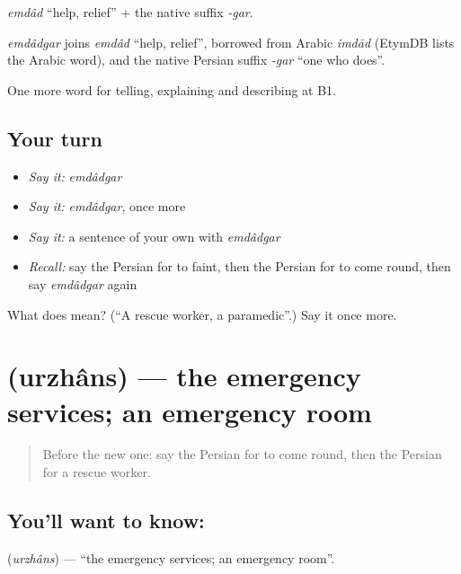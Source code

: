 \emph{emdâd} \textquotedblleft{}help, relief\textquotedblright{} + the native suffix \emph{-gar}.

\begin{cousinweb}
\emph{emdâdgar} joins \emph{emdâd} \textquotedblleft{}help, relief\textquotedblright{}, borrowed from Arabic \emph{imdād} (EtymDB lists the Arabic word), and the native Persian suffix \emph{-gar} \textquotedblleft{}one who does\textquotedblright{}.
\end{cousinweb}

\begin{grammarlens}[title={What you've built}]
One more word for telling, explaining and describing at B1.
\end{grammarlens}

\subsection*{Your turn}
\begin{itemize}
\raggedright
  \item \emph{Say it:} \emph{emdâdgar}
  \item \emph{Say it:} \emph{emdâdgar}, once more
  \item \emph{Say it:} a sentence of your own with \emph{emdâdgar}
  \item \emph{Recall:} say the Persian for to faint, then the Persian for to come round, then say \emph{emdâdgar} again
\end{itemize}

\begin{tcolorbox}[breakable,colback=teal!4,colframe=teal!35!black,title={Before you move on}]
What does  mean? (\textquotedblleft{}A rescue worker, a paramedic\textquotedblright{}.) Say it once more.
\end{tcolorbox}
\section[\texorpdfstring{\fa{اورژانس} (urzhâns)}{اورژانس (urzhâns)}]{ (urzhâns) — the emergency services; an emergency room}

\label{lesson:FA-C327-urzhans}



\begin{quote}
Before the new one: say the Persian for to come round, then the Persian for a rescue worker.
\end{quote}

\subsection*{You'll want to know: }
\textbf{} (\emph{urzhâns}) — \textquotedblleft{}the emergency services; an emergency room\textquotedblright{}.

